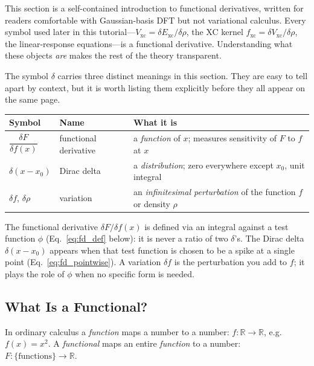 \documentclass[12pt,letterpaper]{article}
\newcommand{\Vxc}{V_{\mathrm{xc}}}
\newcommand{\fxc}{f_{\mathrm{xc}}}
\newcommand{\Exc}{E_{\mathrm{xc}}}
\theoremstyle{definition}
\begin{document}
This section is a self-contained introduction to functional derivatives,
written for readers comfortable with Gaussian-basis DFT but not variational
calculus. Every symbol used later in this tutorial---$\Vxc = \delta\Exc/\delta\rho$,
the XC kernel $\fxc = \delta\Vxc/\delta\rho$, the linear-response equations---is
a functional derivative. Understanding what these objects \emph{are} makes the
rest of the theory transparent.

\begin{tcolorbox}[colback=yellow!6!white, colframe=orange!70!black,
  fonttitle=\bfseries\small, title={Notation: Three Different Uses of $\delta$},
  breakable]
The symbol $\delta$ carries three distinct meanings in this section.
They are easy to tell apart by context, but it is worth listing them
explicitly before they all appear on the same page.

\medskip
\begin{tabular}{@{}lll@{}}
\toprule
Symbol & Name & What it is \\
\midrule
$\dfrac{\delta F}{\delta f(x)}$ & functional derivative
  & a \emph{function} of $x$; measures sensitivity of $F$ to $f$ at $x$ \\[10pt]
$\delta(x - x_0)$ & Dirac delta
  & a \emph{distribution}; zero everywhere except $x_0$, unit integral \\[10pt]
$\delta f$, $\delta\rho$ & variation
  & an \emph{infinitesimal perturbation} of the function $f$ or density $\rho$ \\
\bottomrule
\end{tabular}

\medskip
\noindent The functional derivative $\delta F/\delta f(x)$ is defined via an
integral against a test function $\phi$
(Eq.~\ref{eq:fd_def} below): it is never a ratio of two $\delta$'s.
The Dirac delta $\delta(x-x_0)$ appears when that test function is chosen
to be a spike at a single point (Eq.~\ref{eq:fd_pointwise}).
A variation $\delta f$ is the perturbation you add to $f$; it plays
the role of $\phi$ when no specific form is needed.
\end{tcolorbox}

\subsection{What Is a Functional?}

In ordinary calculus a \emph{function} maps a number to a number:
$f : \mathbb{R} \to \mathbb{R}$, e.g.\ $f(x) = x^2$.
A \emph{functional} maps an entire \emph{function} to a number:
$F : \{\text{functions}\} \to \mathbb{R}$.
\end{document}
